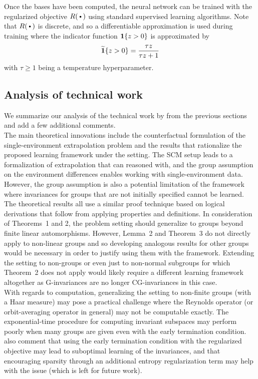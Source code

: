 Once the bases have been computed, the neural network can be trained with the regularized objective $R(\argdot)$ using standard supervised learning algorithms. Note that $R(\argdot)$ is discrete, and so a differentiable approximation is used during training where the indicator function $\mathbf{1}\{z>0\}$ is approximated by
\[
\widetilde{\mathbf{1}}\{z>0\} = \frac{\tau z}{\tau z+1}
\]
with $\tau\geq1$ being a temperature hyperparameter.


\subsection{Analysis of technical work}

We summarize our analysis of the technical work by \textcite{Mouli:2021} from the previous sections and add a few additional comments.
\\

The main theoretical innovations include the counterfactual formulation of the single-environment extrapolation problem and the results that rationalize the proposed learning framework under the setting. The SCM setup leads to a formalization of extrapolation that can reasoned with, and the group assumption on the environment differences enables working with single-environment data. However, the group assumption is also a potential limitation of the framework where invariances for groups that are not initially specified cannot be learned.
\\

The theoretical results all use a similar proof technique based on logical derivations that follow from applying properties and definitions. In consideration of Theorems~1 and 2, the problem setting should generalize to groups beyond finite linear automorphisms. However, Lemma~2 and Theorem~3 do not directly apply to non-linear groups and so developing analogous results for other groups would be necessary in order to justify using them with the framework. Extending the setting to non-groups or even just to non-normal subgroups for which Theorem~2 does not apply would likely require a different learning framework altogether as G-invariances are no longer CG-invariances in this case.
\\

With regards to computation, generalizing the setting to non-finite groups (with a Haar measure) may pose a practical challenge where the Reynolds operator (or orbit-averaging operator in general) may not be computable exactly. The exponential-time procedure for computing invariant subspaces may perform poorly when many groups are given even with the early termination condition. \textcite{Mouli:2021} also comment that using the early termination condition with the regularized objective may lead to suboptimal learning of the invariances, and that encouraging sparsity through an additional entropy regularization term may help with the issue (which is left for future work).

